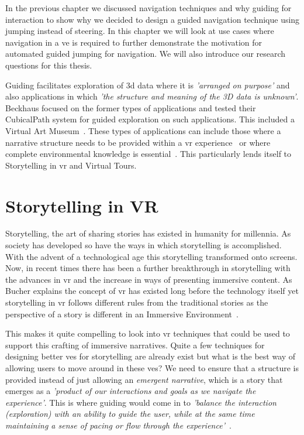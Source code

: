 \label{Chapter:Guided Jumping Motivation}
In the previous chapter we discussed navigation techniques and why guiding for interaction to show why we decided to design a guided navigation technique using jumping instead of steering. In this chapter we will look at use cases where navigation in a \acrshort{ve} is required to further demonstrate the motivation for automated guided jumping for navigation. We will also introduce our research questions for this thesis. 

Guiding facilitates exploration of \acrshort{3d} data where it is \textit{'arranged on purpose'} and also applications in which \textit{'the structure and meaning of the 3D data is unknown'}. Beckhaus focused on the former types of applications and tested their CubicalPath system for guided exploration on such applications. This included a Virtual Art Museum~\cite{Beckhaus2002}. These types of applications can include those where a narrative structure needs to be provided within a \acrshort{vr} experience~\cite{Galyean1995} or where complete environmental knowledge is essential~\cite{Freitag2018}. This particularly lends itself to Storytelling in \acrshort{vr} and Virtual Tours. 

\section{Storytelling in VR}
\label{section:GJM Storytelling in VR}
Storytelling, the art of sharing stories has existed in humanity for millennia. As society has developed so have the ways in which storytelling is accomplished. With the advent of a technological age this storytelling transformed onto screens. Now, in recent times there has been a further breakthrough in storytelling with the advances in \acrshort{vr} and the increase in ways of presenting immersive content. As Bucher explains the concept of \acrshort{vr} has existed long before the technology itself yet storytelling in \acrshort{vr} follows different rules from the traditional stories as the perspective of a story is different in an Immersive Environment~\cite{Bucher2017}.

This makes it quite compelling to look into \acrshort{vr} techniques that could be used to support this crafting of immersive narratives. Quite a few techniques for designing better \acrshort{ve}s for storytelling are already exist but what is the best way of allowing users to move around in these \acrshort{ve}s? We need to ensure that a structure is provided instead of just allowing an \textit{emergent narrative}, which is a story that emerges as a \textit{'product of our interactions and goals as we navigate the experience'}. This is where guiding would come in to \textit{'balance the interaction (exploration) with an ability to guide the user, while at the same time maintaining a sense of pacing or flow through the experience'}~\cite{Galyean1995}.

